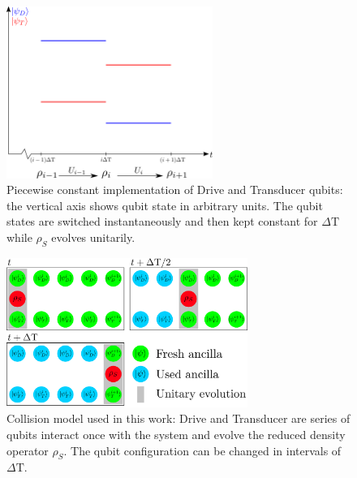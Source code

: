 \begin{figure}
	\centering
	\includegraphics[width=0.6\textwidth]{img/pwc}
	\caption{Piecewise constant implementation of Drive and Transducer qubits: the vertical axis shows qubit state in arbitrary units. The qubit states are switched instantaneously and then kept constant for $\Delta \mathrm{T}$ while $\rho_S$ evolves unitarily.}
	\label{pwc}
\end{figure}

\begin{figure}
	\centering
	\includegraphics[width=0.7\textwidth]{img/collision_model}
	\caption{Collision model used in this work: Drive and Transducer are series of qubits interact once with the system and evolve the reduced density operator $\rho_S$. The qubit configuration can be changed in intervals of $\Delta \mathrm{T}$.}
	\label{collmodel}
\end{figure}